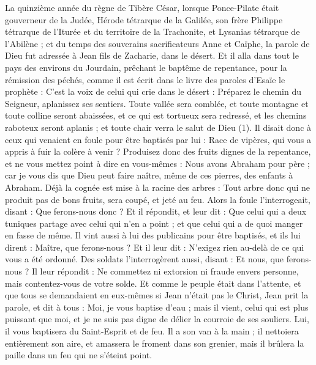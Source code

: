 \begin{multicols}{2}
\VerseOne{}La quinzième année du règne de Tibère César, lorsque Ponce-Pilate était gouverneur de la Judée, Hérode tétrarque de la Galilée, son frère Philippe tétrarque de l’Iturée et du territoire de la Trachonite, et Lysanias tétrarque de l’Abilène ;
et du temps des souverains sacrificateurs Anne et Caïphe, la parole de Dieu fut adressée à Jean fils de Zacharie, dans le désert.
Et il alla dans tout le pays des environs du Jourdain, prêchant le baptême de repentance, pour la rémission des péchés,
comme il est écrit dans le livre des paroles d'Esaïe le prophète : C’est la voix de celui qui crie dans le désert : Préparez le chemin du Seigneur, aplanissez ses sentiers.
Toute vallée sera comblée, et toute montagne et toute colline seront abaissées, et ce qui est tortueux sera redressé, et les chemins raboteux seront aplanis ;
et toute chair verra le salut de Dieu (1).
Il disait donc à ceux qui venaient en foule pour être baptisés par lui : Race de vipères, qui vous a appris à fuir la colère à venir ?
Produisez donc des fruits dignes de la repentance, et ne vous mettez point à dire en vous-mêmes : Nous avons Abraham pour père ; car je vous dis que Dieu peut faire naître, même de ces pierres, des enfants à Abraham.
Déjà la cognée est mise à la racine des arbres : Tout arbre donc qui ne produit pas de bons fruits, sera coupé, et jeté au feu.
Alors la foule l'interrogeait, disant : Que ferons-nous donc ?
Et il répondit, et leur dit : Que celui qui a deux tuniques partage avec celui qui n'en a point ; et que celui qui a de quoi manger en fasse de même.
Il vint aussi à lui des publicains pour être baptisés, et ils lui dirent : Maître, que ferons-nous ?
Et il leur dit : N'exigez rien au-delà de ce qui vous a été ordonné.
Des soldats l'interrogèrent aussi, disant : Et nous, que ferons-nous ? Il leur répondit : Ne commettez ni extorsion ni fraude envers personne, mais contentez-vous de votre solde.
Et comme le peuple était dans l'attente, et que tous se demandaient en eux-mêmes si Jean n'était pas le Christ,
Jean prit la parole, et dit à tous : Moi, je vous baptise d'eau ; mais il vient, celui qui est plus puissant que moi, et je ne suis pas digne de délier la courroie de ses souliers. Lui, il vous baptisera du Saint-Esprit et de feu.
Il a son van à la main ; il nettoiera entièrement son aire, et amassera le froment dans son grenier, mais il brûlera la paille dans un feu qui ne s'éteint point.

\end{multicols}
